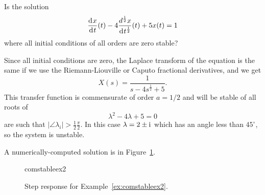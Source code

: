 \begin{example}
  Is the solution
  \begin{equation*}
  	\frac{\operatorname{d}\hspace*{-1pt} x}{\operatorname{d}\hspace*{-1pt} t}(t) -4  \frac{d^\frac{1}{2} x}{\operatorname{d}\hspace*{-1pt} t^\frac{1}{2}}(t) + 5 x(t) = 1
  \end{equation*}
  where all initial conditions of all orders are zero stable?

  Since all initial conditions are zero, the Laplace transform of the equation is the same if we use the Riemann-Liouville or Caputo fractional derivatives, and we get
  \begin{equation*}
    X(s) = \frac{1}{s - 4 s^\frac{1}{2} + 5}.
  \end{equation*}
  This transfer function is commensurate of order $a = 1/2$ and will be stable of all roots of
  \begin{equation*}
    \lambda^2 - 4 \lambda + 5 = 0
  \end{equation*}
   are such that $\left| \angle \lambda_i \right| > \frac{1}{2} \frac{\pi}{2}$.  In this case $\lambda = 2 \pm  \mathrm{i}\mkern1mu$ which has an angle less than $45^\circ$, so the system is unstable. 

	A numerically-computed solution is in Figure~\ref{fig:comstableex2}.
	\label{ex:comstableex2}
\end{example}

\begin{figure}
  \centering
  {comstableex2}
  \caption{Step response for Example~\ref{ex:comstableex2}.}
  \label{fig:comstableex2}
\end{figure}

